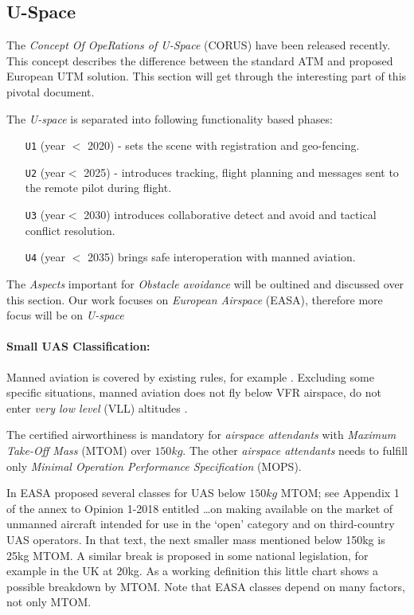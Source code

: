 \subsection{U-Space}\label{sec:USpace}

\noindent The \emph{Concept Of OpeRations of U-Space} (CORUS) \cite{corus2018} have been released recently. This concept describes the difference between the standard ATM and proposed European UTM solution. This section will get through the interesting part of this pivotal document.

\noindent The \emph{U-space} is separated into following functionality based phases:
\begin{itemize}
    \item[\texttt{U1}] (year $<$ 2020) - sets the scene with registration and geo-fencing.
    
    \item[\texttt{U2}] (year$<$ 2025) - introduces tracking, flight planning and messages sent to the remote pilot during flight.
    
    \item[\texttt{U3}] (year$<$ 2030) introduces collaborative detect and avoid and tactical conflict resolution.
    
    \item[\texttt{U4}] (year $<$ 2035) brings safe interoperation with manned aviation.
\end{itemize}

The \emph{Aspects} important for \emph{Obstacle avoidance} will be oultined and discussed over this section. Our work focuses on \emph{European Airspace} (EASA), therefore more focus will be on \emph{U-space}

\paragraph{Small UAS Classification:} Manned aviation is covered by existing rules, for example \cite{icaoAnnex2,ec201208ref5}. Excluding some specific situations, manned aviation does not fly below VFR airspace, do not enter \emph{very low level} (VLL) altitudes \cite{ec200802ref4}. 

The certified airworthiness is mandatory for \emph{airspace attendants} with \emph{Maximum Take-Off Mass} (MTOM) over $150 kg$. The other \emph{airspace attendants} needs to fulfill only \emph{Minimal Operation Performance Specification} (MOPS). 

In \cite{easa201801op} EASA proposed several classes for UAS below $150kg$ MTOM; see Appendix 1 of the annex to
Opinion 1-2018 entitled …on making available on the market of unmanned aircraft intended for use in
the ‘open’ category and on third-country UAS operators. In that text, the next smaller mass mentioned
below 150kg is 25kg MTOM. A similar break is proposed in some national legislation, for example in
the UK at 20kg. As a working definition this little chart shows a possible breakdown by MTOM. Note
that EASA classes depend on many factors, not only MTOM.

